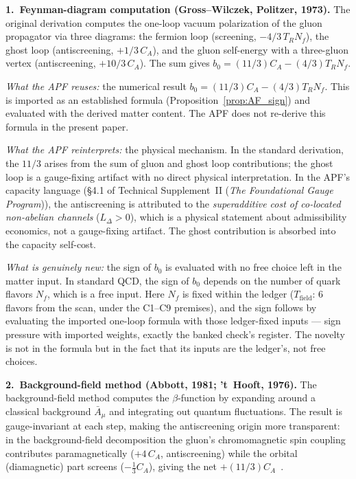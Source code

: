 \documentclass[11pt]{article}
\theoremstyle{definition}
\newcommand{\TSII}{Technical Supplement~II (\emph{The Foundational Gauge Program})}
\begin{document}
\smallskip\noindent\textbf{1.\ Feynman-diagram computation
(Gross--Wilczek, Politzer, 1973).}\quad
The original derivation computes the one-loop vacuum polarization of
the gluon propagator via three diagrams: the fermion loop (screening,
$-4/3\, T_R N_f$), the ghost loop (antiscreening, $+1/3\, C_A$), and
the gluon self-energy with a three-gluon vertex (antiscreening,
$+10/3\, C_A$).  The sum gives $b_0 = (11/3)C_A - (4/3)T_R N_f$.

\textit{What the APF reuses:} the numerical result
$b_0 = (11/3)C_A - (4/3)T_R N_f$.  This is imported as an established
formula (Proposition~\ref{prop:AF_sign}) and evaluated with the
derived matter content.  The APF does not re-derive this formula in
the present paper.

\textit{What the APF reinterprets:} the physical mechanism.  In the
standard derivation, the $11/3$ arises from the sum of gluon and ghost
loop contributions; the ghost loop is a gauge-fixing artifact with no
direct physical interpretation.  In the APF's capacity language
(\S4.1 of \TSII{}), the antiscreening is attributed to the
\emph{superadditive cost of co-located non-abelian channels}
($L_\Delta > 0$), which is a physical statement about admissibility
economics, not a gauge-fixing artifact.  The ghost contribution is
absorbed into the capacity self-cost.

\textit{What is genuinely new:} the sign of $b_0$ is evaluated with
no free choice left in the matter input.  In standard QCD, the sign
of $b_0$ depends on the number of quark flavors $N_f$, which is a
free input.  Here $N_f$ is fixed within the ledger
($T_{\mathrm{field}}$: 6 flavors from the scan, under the C1--C9
premises), and the sign follows by evaluating the imported one-loop
formula with those ledger-fixed inputs --- sign pressure with imported
weights, exactly the banked check's register.  The novelty is not in
the formula but in the fact that its inputs are the ledger's, not
free choices.

\smallskip\noindent\textbf{2.\ Background-field method
(Abbott, 1981; 't~Hooft, 1976).}\quad
The background-field method computes the $\beta$-function by expanding
around a classical background $\bar{A}_\mu$ and integrating out
quantum fluctuations.  The result is gauge-invariant at each step,
making the antiscreening origin more transparent: in the
background-field decomposition the gluon's chromomagnetic spin
coupling contributes paramagnetically ($+4\,C_A$, antiscreening)
while the orbital (diamagnetic) part screens ($-\tfrac{1}{3}C_A$),
giving the net $+(11/3)C_A$~\cite{Hughes1980,Nielsen1981}.
\end{document}

